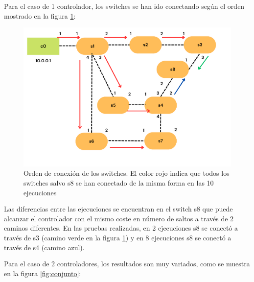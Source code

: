 \documentclass[a4paper, 12pt]{book}
\begin{document}
 	Para el caso de 1 controlador, los switches se han ido conectando según el orden mostrado en la figura \ref{figura:escenario1_1c_1}:
 	
 	\begin{figure}[H]
 		\centering
 		\includegraphics[width=14cm, keepaspectratio]{img/rutasEscenario1-1c}
 		\caption{Orden de conexión de los switches. El color rojo indica que todos los switches salvo s8 se han conectado de la misma forma en las 10 ejecuciones}
 		\label{figura:escenario1_1c_1}
 	\end{figure}
 	
 	Las diferencias entre las ejecuciones se encuentran en el switch s8 que puede alcanzar
 	el controlador con el mismo coste en número de saltos a través de 2 caminos diferentes.
 	En las pruebas realizadas, en 2 ejecuciones s8 se conectó a través de s3 (camino verde
 	en la figura \ref{figura:escenario1_1c_1})	y en 8 ejecuciones s8 se conectó a través de s4 (camino	azul).
 	
 	Para el caso de 2 controladores, los resultados son muy variados, como se muestra en la figura \ref{fig:conjunto}:
 	
\end{document}
